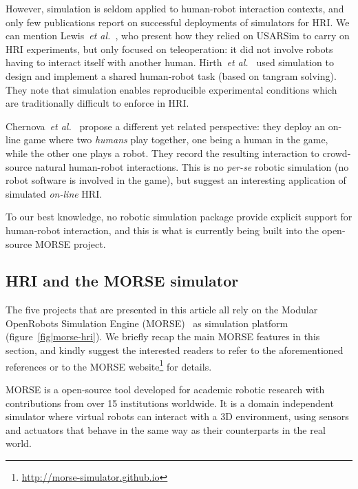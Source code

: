\documentclass[conference]{IEEEtran}
\newcommand{\etal}{{\textit{et al.~}}}
\begin{document}
However, simulation is seldom applied to human-robot interaction contexts, and
only few publications report on successful deployments of simulators for HRI.
We can mention Lewis~\etal\cite{lewis2007usarsim}, who present how they relied
on {\sc USARSim} to carry on HRI experiments, but only focused on
teleoperation: it did not involve robots having to interact itself with another
human.  Hirth~\etal\cite{hirth2013development} used simulation to design and
implement a shared human-robot task (based on tangram solving). They note that
simulation enables reproducible experimental conditions which are traditionally
difficult to enforce in HRI.

Chernova~\etal\cite{Chernova2011} propose a different yet related perspective:
they deploy an on-line game where two \emph{humans} play together, one being a
human in the game, while the other one plays a robot. They record the resulting
interaction to crowd-source natural human-robot interactions. This is no
\textit{per-se} robotic simulation (no robot software is involved in the game),
but suggest an interesting application of simulated \emph{on-line} HRI.




To our best knowledge, no robotic simulation package provide explicit support
for human-robot interaction, and this is what is currently being built into the
open-source MORSE project.

\subsection*{HRI and the MORSE simulator}

The five projects that are presented in this article all rely on the Modular
OpenRobots Simulation Engine (MORSE)~\cite{Echeverria2011, morse_simpar_2012} as
simulation platform (figure~\ref{fig|morse-hri}). We briefly recap the main
MORSE features in this section, and kindly suggest the interested readers to
refer to the aforementioned references or to the MORSE
website\footnote{\url{http://morse-simulator.github.io}} for details.

MORSE is a open-source tool developed for academic robotic research with
contributions from over 15 institutions worldwide. It is a domain independent
simulator where virtual robots can interact with a 3D environment, using
sensors and actuators that behave in the same way as their counterparts in the
real world.
\end{document}
